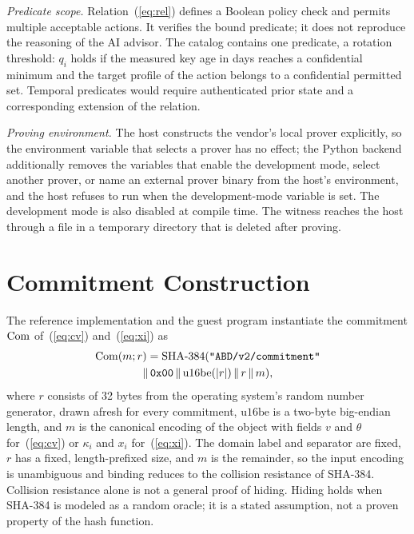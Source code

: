 \emph{Predicate scope.} Relation~(\ref{eq:rel}) defines a Boolean policy check and permits multiple acceptable actions. It verifies the bound predicate; it does not reproduce the reasoning of the AI advisor. The catalog contains one predicate, a rotation threshold: $q_i$ holds if the measured key age in days reaches a confidential minimum and the target profile of the action belongs to a confidential permitted set. Temporal predicates would require authenticated prior state and a corresponding extension of the relation.

\emph{Proving environment.} The host constructs the vendor's local prover explicitly, so the environment variable that selects a prover has no effect; the Python backend additionally removes the variables that enable the development mode, select another prover, or name an external prover binary from the host's environment, and the host refuses to run when the development-mode variable is set. The development mode is also disabled at compile time. The witness reaches the host through a file in a temporary directory that is deleted after proving.

\section{Commitment Construction}
\label{s:zkcommit}
The reference implementation and the guest program instantiate the commitment $\mathrm{Com}$ of~(\ref{eq:cv}) and~(\ref{eq:xi}) as
\begin{multline*}
\mathrm{Com}(m; r) = \mathrm{SHA\text{-}384}(\texttt{"ABD/v2/commitment"}\\
\|\, \texttt{0x00} \,\|\, \mathrm{u16be}(|r|) \,\|\, r \,\|\, m),
\end{multline*}
where $r$ consists of 32 bytes from the operating system's random number generator, drawn afresh for every commitment, $\mathrm{u16be}$ is a two-byte big-endian length, and $m$ is the canonical encoding of the object with fields $v$ and $\theta$ for~(\ref{eq:cv}) or $\kappa_i$ and $x_i$ for~(\ref{eq:xi}). The domain label and separator are fixed, $r$ has a fixed, length-prefixed size, and $m$ is the remainder, so the input encoding is unambiguous and binding reduces to the collision resistance of SHA-384. Collision resistance alone is not a general proof of hiding. Hiding holds when SHA-384 is modeled as a random oracle; it is a stated assumption, not a proven property of the hash function.

